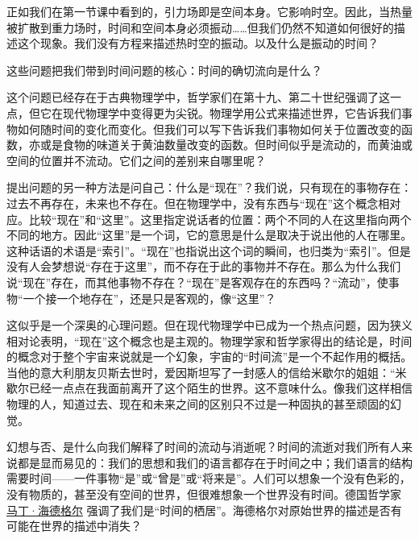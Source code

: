     正如我们在第一节课中看到的，引力场即是空间本身。它影响时空。因此，当热量被扩散到重力场时，时间和空间本身必须振动……但我们仍然不知道如何很好的描述这个现象。我们没有方程来描述热时空的振动。以及什么是振动的时间？

    这些问题把我们带到时间问题的核心：时间的确切流向是什么？

    这个问题已经存在于古典物理学中，哲学家们在第十九、第二十世纪强调了这一点，但它在现代物理学中变得更为尖锐。物理学用公式来描述世界，它告诉我们事物如何随时间的变化而变化。但我们可以写下告诉我们事物如何关于位置改变的函数，亦或是食物的味道关于黄油数量改变的函数。但时间似乎是流动的，而黄油或空间的位置并不流动。它们之间的差别来自哪里呢？

    提出问题的另一种方法是问自己：什么是“现在”？我们说，只有现在的事物存在：过去不再存在，未来也不存在。但在物理学中，没有东西与“现在”这个概念相对应。比较“现在”和“这里”。这里指定说话者的位置：两个不同的人在这里指向两个不同的地方。因此“这里”是一个词，它的意思是什么是取决于说出他的人在哪里。这种话语的术语是“索引”。“现在”也指说出这个词的瞬间，也归类为“索引”。但是没有人会梦想说“存在于这里”，而不存在于此的事物并不存在。那么为什么我们说“现在”存在，而其他事物不存在？“现在”是客观存在的东西吗？“流动”，使事物“一个接一个地存在”，还是只是客观的，像“这里”？

    这似乎是一个深奥的心理问题。但在现代物理学中已成为一个热点问题，因为狭义相对论表明，“现在”这个概念也是主观的。物理学家和哲学家得出的结论是，时间的概念对于整个宇宙来说就是一个幻象，宇宙的“时间流”是一个不起作用的概括。当他的意大利朋友贝斯去世时，爱因斯坦写了一封感人的信给米歇尔的姐姐：“米歇尔已经一点点在我面前离开了这个陌生的世界。这不意味什么。像我们这样相信物理的人，知道过去、现在和未来之间的区别只不过是一种固执的甚至顽固的幻觉。

    幻想与否、是什么向我们解释了时间的流动与消逝呢？时间的流逝对我们所有人来说都是显而易见的：我们的思想和我们的语言都存在于时间之中；我们语言的结构需要时间——一件事物“是”或“曾是”或“将来是”。人们可以想象一个没有色彩的，没有物质的，甚至没有空间的世界，但很难想象一个世界没有时间。德国哲学家
\href{http://toyhouse.cc/wiki/index.php/马丁·海德格尔}{马丁·海德格尔}
强调了我们是“时间的栖居”。海德格尔对原始世界的描述是否有可能在世界的描述中消失？

